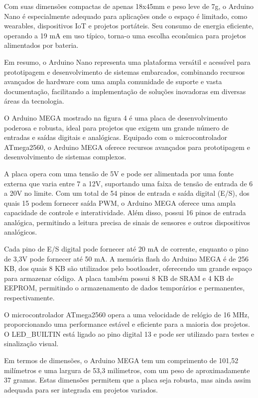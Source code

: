 Com suas dimensões compactas de apenas 18x45mm e peso leve de 7g, o Arduino Nano é especialmente adequado para aplicações onde o espaço é limitado, como wearables, dispositivos IoT e projetos portáteis. Seu consumo de energia eficiente, operando a 19 mA em uso típico, torna-o uma escolha econômica para projetos alimentados por bateria.

Em resumo, o Arduino Nano representa uma plataforma versátil e acessível para prototipagem e desenvolvimento de sistemas embarcados, combinando recursos avançados de hardware com uma ampla comunidade de suporte e vasta documentação, facilitando a implementação de soluções inovadoras em diversas áreas da tecnologia.


O Arduino MEGA mostrado na figura 4 é uma placa de desenvolvimento poderosa e robusta, ideal para projetos que exigem um grande número de entradas e saídas digitais e analógicas. Equipado com o microcontrolador ATmega2560, o Arduino MEGA oferece recursos avançados para prototipagem e desenvolvimento de sistemas complexos.

A placa opera com uma tensão de 5V e pode ser alimentada por uma fonte externa que varia entre 7 a 12V, suportando uma faixa de tensão de entrada de 6 a 20V no limite. Com um total de 54 pinos de entrada e saída digital (E/S), dos quais 15 podem fornecer saída PWM, o Arduino MEGA oferece uma ampla capacidade de controle e interatividade. Além disso, possui 16 pinos de entrada analógica, permitindo a leitura precisa de sinais de sensores e outros dispositivos analógicos.

Cada pino de E/S digital pode fornecer até 20 mA de corrente, enquanto o pino de 3,3V pode fornecer até 50 mA. A memória flash do Arduino MEGA é de 256 KB, dos quais 8 KB são utilizados pelo bootloader, oferecendo um grande espaço para armazenar código. A placa também possui 8 KB de SRAM e 4 KB de EEPROM, permitindo o armazenamento de dados temporários e permanentes, respectivamente.

O microcontrolador ATmega2560 opera a uma velocidade de relógio de 16 MHz, proporcionando uma performance estável e eficiente para a maioria dos projetos. O LED\_BUILTIN está ligado ao pino digital 13 e pode ser utilizado para testes e sinalização visual.

Em termos de dimensões, o Arduino MEGA tem um comprimento de 101,52 milímetros e uma largura de 53,3 milímetros, com um peso de aproximadamente 37 gramas. Estas dimensões permitem que a placa seja robusta, mas ainda assim adequada para ser integrada em projetos variados.


